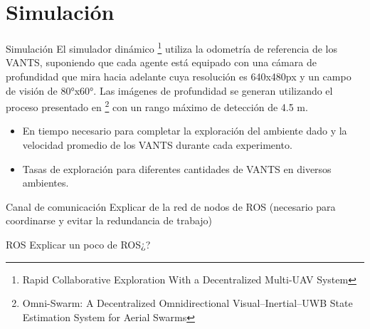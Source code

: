 \documentclass[
  24pt, %
  aspectratio=169, %
]{beamer}
\begin{document}
\section{Simulación}
\begin{frame}{Simulación}
  El simulador dinámico \cite{RACER2022} \footnote{Rapid Collaborative Exploration With a Decentralized Multi-UAV System} utiliza la odometría de referencia de los VANTS, suponiendo que cada agente está equipado con una cámara de profundidad que mira hacia adelante cuya resolución es 640x480px y un campo de visión de 80°x60°. Las imágenes de profundidad se generan utilizando el proceso presentado en \cite{OMNI2022} \footnote{Omni-Swarm: A Decentralized Omnidirectional Visual–Inertial–UWB State Estimation System for Aerial Swarms} con un rango máximo de detección de 4.5 m.
  \bigskip %
  \begin{itemize}
  \item En tiempo necesario para completar la exploración del ambiente dado y la velocidad promedio de los VANTS durante cada experimento.
  \item Tasas de exploración para diferentes cantidades de VANTS en diversos ambientes.
  \end{itemize}
\end{frame}


\begin{frame}{Canal de comunicación}
  Explicar de la red de nodos de ROS (necesario para coordinarse y evitar la redundancia de trabajo)
\end{frame}

\begin{frame}{ROS}
  Explicar un poco de ROS¿?
\end{frame}
\end{document}
